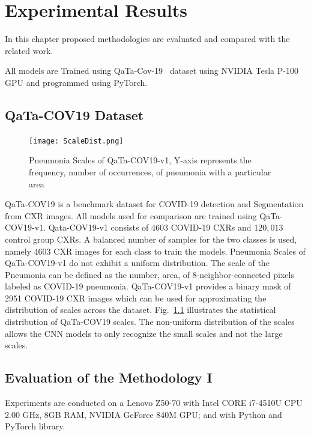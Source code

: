
\chapter{Experimental Results} %

\label{chp:results} %
In this chapter proposed methodologies are evaluated and compared with the related work.

All models are Trained using QaTa-Cov-19~\cite{ahishali2021advance} dataset using NVIDIA Tesla P-100 GPU and programmed using PyTorch.
\section{QaTa-COV19 Dataset}
\begin{center}
\begin{figure}[htbp]
\centerline{\texttt{[image: ScaleDist.png]}}
\caption{Pneumonia Scales of QaTa-COV19-v1, Y-axis represents the frequency, number of occurrences, of pneumonia with a particular area}
\label{pdist}
\end{figure}
\end{center}
QaTa-COV19 is a benchmark dataset for COVID-19 detection and Segmentation from CXR images. All models used for comparison are trained using QaTa-COV19-v1. Qata-COV19-v1 consists of 4603 COVID-19 CXRs and $120,013$ control group CXRs. A balanced number of samples for the two classes is used, namely 4603 CXR images for each class to train the models. Pneumonia Scales of QaTa-COV19-v1 do not exhibit a uniform distribution. The scale of the Pneumonia can be defined as the number, area, of 8-neighbor-connected pixels labeled as COVID-19 pneumonia. QaTa-COV19-v1 provides a binary mask of 2951 COVID-19 CXR images which can be used for approximating the distribution of scales across the dataset. Fig.~\ref{pdist} illustrates the statistical distribution of QaTa-COV19 scales. The non-uniform distribution of the scales allows the CNN models to only recognize the small scales and not the large scales.

\section{Evaluation of the Methodology I}

Experiments are conducted on a Lenovo Z50-70 with Intel CORE i7-4510U CPU 2.00 GHz, 8GB RAM, NVIDIA GeForce 840M GPU; and with Python and PyTorch library.

